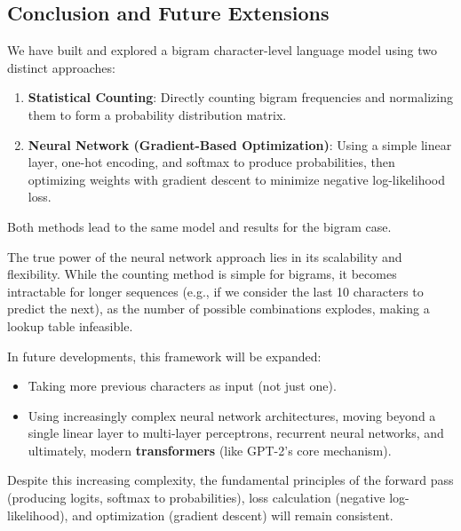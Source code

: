 \subsection{Conclusion and Future Extensions}
We have built and explored a bigram character-level language model using two distinct approaches:
\begin{enumerate}
    \item \textbf{Statistical Counting}: Directly counting bigram frequencies and normalizing them to form a probability distribution matrix.
    \item \textbf{Neural Network (Gradient-Based Optimization)}: Using a simple linear layer, one-hot encoding, and softmax to produce probabilities, then optimizing weights with gradient descent to minimize negative log-likelihood loss.
\end{enumerate}

Both methods lead to the same model and results for the bigram case.

The true power of the neural network approach lies in its scalability and flexibility. While the counting method is simple for bigrams, it becomes intractable for longer sequences (e.g., if we consider the last 10 characters to predict the next), as the number of possible combinations explodes, making a lookup table infeasible.

In future developments, this framework will be expanded:
\begin{itemize}
    \item Taking more previous characters as input (not just one).
    \item Using increasingly complex neural network architectures, moving beyond a single linear layer to multi-layer perceptrons, recurrent neural networks, and ultimately, modern \textbf{transformers} (like GPT-2's core mechanism).
\end{itemize}

Despite this increasing complexity, the fundamental principles of the forward pass (producing logits, softmax to probabilities), loss calculation (negative log-likelihood), and optimization (gradient descent) will remain consistent.